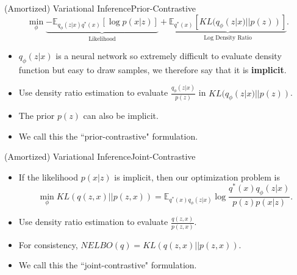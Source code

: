 \documentclass{beamer}
\newcommand{\E}{\mathbb{E}}
\begin{document}
\begin{frame}{(Amortized) Variational Inference}{Prior-Contrastive}
\[\min_\phi \underbrace{-\mathbb{E}_{q_\phi(z|x)q^*(x)}[\log p(x|z)]}_\text{Likelihood}+\underbrace{\mathbb{E}_{q^*(x)}[KL(q_\phi(z|x)||p(z))]}_\text{Log Density Ratio}.\]
\begin{itemize}
\item $q_\phi(z|x)$ is a neural network so extremely difficult to evaluate density function but easy to draw samples, we therefore say that it is \textbf{implicit}.
\item Use density ratio estimation to evaluate $\frac{q_\phi(z|x)}{p(z)}$ in $KL(q_\phi(z|x)||p(z))$.
\item The prior $p(z)$ can also be implicit.
\item We call this the ``prior-contrastive" formulation.
\end{itemize}
\end{frame}
\begin{frame}{(Amortized) Variational Inference}{Joint-Contrastive}
\begin{itemize}
\item If the likelihood $p(x|z)$ is implicit, then our optimization problem is \[\min_\phi KL(q(z,x)||p(z,x))=\E_{q^*(x)q_\phi(z|x)}\log \frac{q^*(x)q_\phi(z|x)}{p(z)p(x|z)}.\]
\item Use density ratio estimation to evaluate $\frac{q(z,x)}{p(z,x)}$.
\item For consistency, $NELBO(q)= KL(q(z,x)||p(z,x))$.
\item We call this the ``joint-contrastive" formulation.
\end{itemize}
\end{frame}
\end{document}
